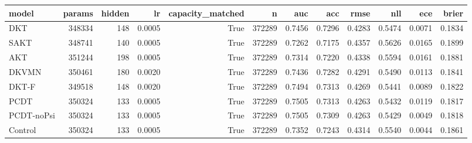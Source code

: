 \begin{tabular}{lrrrrrrrrrrr}
\toprule
model & params & hidden & lr & capacity\_matched & n & auc & acc & rmse & nll & ece & brier \\
\midrule
DKT & 348334 & 148 & 0.0005 & True & 372289 & 0.7456 & 0.7296 & 0.4283 & 0.5474 & 0.0071 & 0.1834 \\
SAKT & 348741 & 140 & 0.0005 & True & 372289 & 0.7262 & 0.7175 & 0.4357 & 0.5626 & 0.0165 & 0.1899 \\
AKT & 351244 & 198 & 0.0005 & True & 372289 & 0.7314 & 0.7220 & 0.4338 & 0.5594 & 0.0161 & 0.1881 \\
DKVMN & 350461 & 180 & 0.0020 & True & 372289 & 0.7436 & 0.7282 & 0.4291 & 0.5490 & 0.0113 & 0.1841 \\
DKT-F & 349518 & 148 & 0.0020 & True & 372289 & 0.7494 & 0.7313 & 0.4269 & 0.5441 & 0.0089 & 0.1822 \\
PCDT & 350324 & 133 & 0.0005 & True & 372289 & 0.7505 & 0.7313 & 0.4263 & 0.5432 & 0.0119 & 0.1817 \\
PCDT-noPsi & 350324 & 133 & 0.0005 & True & 372289 & 0.7505 & 0.7309 & 0.4263 & 0.5429 & 0.0049 & 0.1818 \\
Control & 350324 & 133 & 0.0005 & True & 372289 & 0.7352 & 0.7243 & 0.4314 & 0.5540 & 0.0044 & 0.1861 \\
\bottomrule
\end{tabular}
